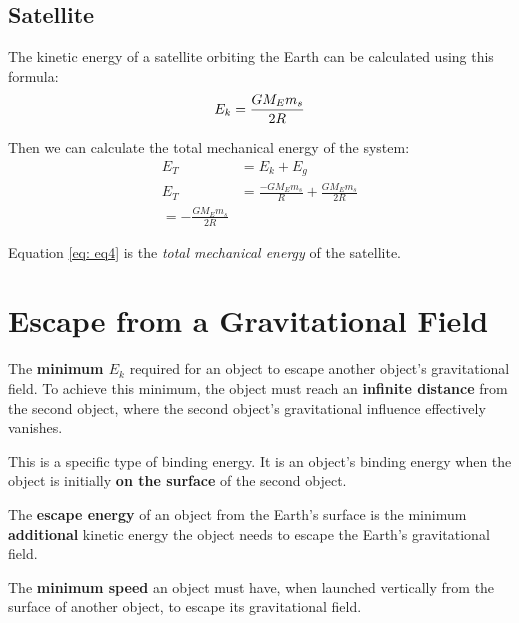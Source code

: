 \subsection{Satellite}
The kinetic energy of a satellite orbiting the Earth can be calculated using this formula:
\begin{equation}
    E_k = \frac{
        G \space M_E \space m_s
    }{
        2R
    }
\end{equation}

Then we can calculate the total mechanical energy of the system:
\begin{align}
    E_T &= E_k + E_g\\
    E_T &= \frac{
        - G M_E m_s
    }{
        R
    } +
    \frac{
        G M_E m_s
    }{
        2R
    } \\
    = -\frac{
        G M_E m_s
    }{
        2R
    } \label{eq: eq4}
\end{align}

Equation \ref{eq: eq4} is the \textit{total mechanical energy} of the satellite.

\newpage
\section{Escape from a Gravitational Field}
\begin{definition}
     The \textbf{minimum $E_k$} required for an object to escape another object's gravitational field. To achieve this minimum, the object must reach an 
    \textbf{infinite distance} from the second object, where the second object's gravitational influence effectively vanishes.
\end{definition}

\begin{definition}
     This is a specific type of binding energy. It is an object's binding energy when the object is initially \textbf{on the surface} of the second object.
\end{definition}

\begin{example}
    The \textbf{escape energy} of an object from the Earth's surface is the minimum \textbf{additional} kinetic energy the object needs to escape the Earth's gravitational field.
\end{example}

\begin{definition}
     The \textbf{minimum speed} an object must have, when launched vertically from the surface of another object, to escape its gravitational field.
\end{definition}

